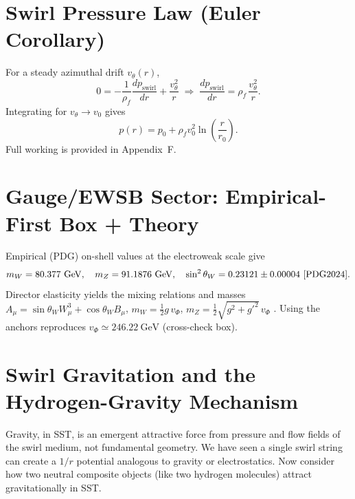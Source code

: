 \documentclass[reprint,aps,onecolumn,nofootinbib]{revtex4-2}
\newcommand{\rhof}{\rho_{\!f}}                           %
\begin{document}
    \section{Swirl Pressure Law (Euler Corollary)}\label{canon58:pressure}
    For a steady azimuthal drift $v_\theta(r)$,
    \[
        0=-\frac{1}{\rhof}\frac{dp_{\text{swirl}}}{dr}+\frac{v_\theta^2}{r}
        \;\Rightarrow\;
        \frac{dp_{\text{swirl}}}{dr}=\rhof\,\frac{v_\theta^2}{r}.
    \]
    Integrating for $v_\theta\to v_0$ gives
    \[
        p(r)=p_0+\rhof v_0^2\ln\!\left(\frac{r}{r_0}\right).
    \]
    Full working is provided in Appendix~F.


    \section{Gauge/EWSB Sector: Empirical-First Box + Theory}\label{canon58:gauge-openers}
    Empirical (PDG) on-shell values at the electroweak scale give
    \[
        m_W=80.377~\mathrm{GeV},\quad m_Z=91.1876~\mathrm{GeV},\quad \sin^2\theta_W=0.23121\pm0.00004 \ \cite{PDG2024}.
    \]
    Director elasticity yields the mixing relations and masses
    $A_\mu=\sin\theta_W W^3_\mu+\cos\theta_W B_\mu$,
    $m_W=\tfrac12 g\,v_\Phi$, $m_Z=\tfrac12\sqrt{g^2+g'^2}\,v_\Phi$ \cite{Weinberg1967,PeskinSchroeder1995}.
    Using the anchors reproduces $v_\Phi\simeq 246.22~\mathrm{GeV}$ (cross-check box). %



    \section{Swirl Gravitation and the Hydrogen-Gravity Mechanism}
        Gravity, in SST, is an emergent attractive force from pressure and flow fields of the swirl medium, not fundamental geometry. We have seen a single swirl string can create a $1/r$ potential analogous to gravity or electrostatics. Now consider how two neutral composite objects (like two hydrogen molecules) attract gravitationally in SST.
\end{document}
